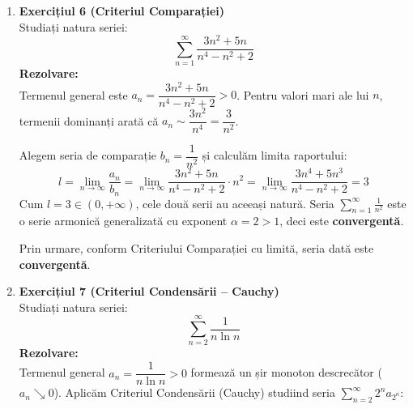 \documentclass[12pt, a4paper]{report}
\begin{document}
\begin{enumerate}[label=\textbf{\roman*)}]
		Avem:
		\[
		\ln \left(\frac{1}{a_n}\right) = \ln \left( \left(\frac{n+1}{n}\right)^{n^2} \right) = n^2 \ln \left(1 + \frac{1}{n}\right)
		\]
		Aplicăm Criteriul Logaritmic calculând limita:
		\[
		l = \lim_{n \to \infty} \frac{\ln \left(\frac{1}{a_n}\right)}{\ln n} = \lim_{n \to \infty} \frac{n^2 \ln \left(1 + \frac{1}{n}\right)}{\ln n}
		\]
		Utilizând limita remarcabilă $\lim_{x \to 0} \dfrac{\ln(1+x)}{x} = 1$, rescriem numărătorul:
		\[
		n^2 \ln \left(1 + \frac{1}{n}\right) = n \cdot \frac{\ln \left(1 + \frac{1}{n}\right)}{\frac{1}{n}} \sim n
		\]
		Limita devine astfel:
		\[
		l = \lim_{n \to \infty} \frac{n}{\ln n} = +\infty
		\]
		Deoarece $l = +\infty > 1$, conform Criteriului Logaritmic, seria este \textbf{convergentă}.
		
		\vspace{0.5cm}
		
		\item \textbf{Exercițiul 6 (Criteriul Comparației)} \\
		Studiați natura seriei:
		\[
		\sum_{n=1}^{\infty} \frac{3n^2 + 5n}{n^4 - n^2 + 2}
		\]
		\textbf{Rezolvare:} \\
		Termenul general este $a_n = \dfrac{3n^2 + 5n}{n^4 - n^2 + 2} > 0$. Pentru valori mari ale lui $n$, termenii dominanți arată că $a_n \sim \dfrac{3n^2}{n^4} = \dfrac{3}{n^2}$.
		
		Alegem seria de comparație $b_n = \dfrac{1}{n^2}$ și calculăm limita raportului:
		\[
		l = \lim_{n \to \infty} \frac{a_n}{b_n} = \lim_{n \to \infty} \frac{3n^2 + 5n}{n^4 - n^2 + 2} \cdot n^2 = \lim_{n \to \infty} \frac{3n^4 + 5n^3}{n^4 - n^2 + 2} = 3
		\]
		Cum $l = 3 \in (0, +\infty)$, cele două serii au aceeași natură. Seria $\sum_{n=1}^{\infty} \frac{1}{n^2}$ este o serie armonică generalizată cu exponent $\alpha = 2 > 1$, deci este \textbf{convergentă}.
		
		Prin urmare, conform Criteriului Comparației cu limită, seria dată este \textbf{convergentă}.
		
		\vspace{0.5cm}
		
		\item \textbf{Exercițiul 7 (Criteriul Condensării -- Cauchy)} \\
		Studiați natura seriei:
		\[
		\sum_{n=2}^{\infty} \frac{1}{n \ln n}
		\]
		\textbf{Rezolvare:} \\
		Termenul general $a_n = \dfrac{1}{n \ln n} > 0$ formează un șir monoton descrecător ($a_n \searrow 0$). Aplicăm Criteriul Condensării (Cauchy) studiind seria $ \sum_{n=2}^{\infty} 2^n a_{2^n} $:
		

\end{enumerate}
\end{document}
